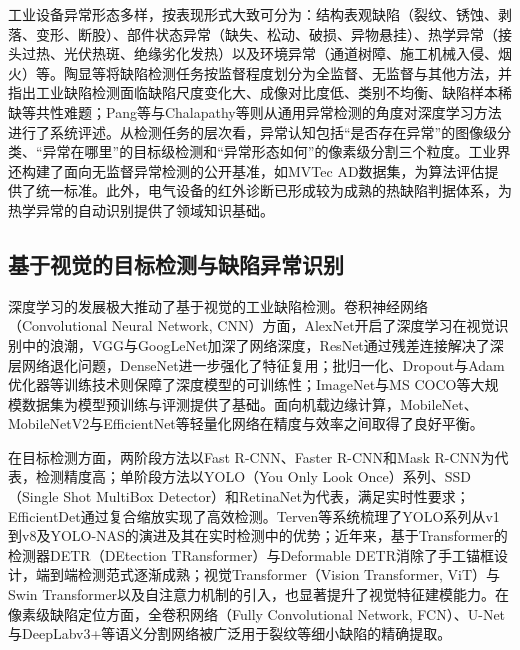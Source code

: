 工业设备异常形态多样，按表现形式大致可分为：结构表观缺陷（裂纹、锈蚀、剥落、变形、断股）、部件状态异常（缺失、松动、破损、异物悬挂）、热学异常（接头过热、光伏热斑、绝缘劣化发热）以及环境异常（通道树障、施工机械入侵、烟火）等\cite{taox2021survey,nguyen2018automatic,miao2020uav}。陶显等\cite{taox2021survey}将缺陷检测任务按监督程度划分为全监督、无监督与其他方法，并指出工业缺陷检测面临缺陷尺度变化大、成像对比度低、类别不均衡、缺陷样本稀缺等共性难题；Pang等\cite{pang2021deep}与Chalapathy等则从通用异常检测的角度对深度学习方法进行了系统评述。从检测任务的层次看，异常认知包括“是否存在异常”的图像级分类、“异常在哪里”的目标级检测和“异常形态如何”的像素级分割三个粒度\cite{taox2021survey}。工业界还构建了面向无监督异常检测的公开基准，如MVTec AD数据集\cite{bergmann2019mvtec}，为算法评估提供了统一标准。此外，电气设备的红外诊断已形成较为成熟的热缺陷判据体系\cite{jadin2012recent,usamentiaga2014infrared}，为热学异常的自动识别提供了领域知识基础。

\subsection{基于视觉的目标检测与缺陷异常识别}

深度学习的发展极大推动了基于视觉的工业缺陷检测。卷积神经网络（Convolutional Neural Network, CNN）方面，AlexNet\cite{krizhevsky2012imagenet}开启了深度学习在视觉识别中的浪潮，VGG\cite{simonyan2015very}与GoogLeNet加深了网络深度，ResNet\cite{he2016deep}通过残差连接解决了深层网络退化问题，DenseNet进一步强化了特征复用；批归一化\cite{ioffe2015batch}、Dropout\cite{srivastava2014dropout}与Adam优化器\cite{kingma2015adam}等训练技术则保障了深度模型的可训练性；ImageNet\cite{deng2009imagenet}与MS COCO\cite{lin2014microsoft}等大规模数据集为模型预训练与评测提供了基础。面向机载边缘计算，MobileNet\cite{howard2017mobilenets}、MobileNetV2与EfficientNet\cite{tan2019efficientnet}等轻量化网络在精度与效率之间取得了良好平衡。

在目标检测方面，两阶段方法以Fast R-CNN\cite{girshick2015fast}、Faster R-CNN\cite{ren2015faster}和Mask R-CNN\cite{he2017mask}为代表，检测精度高；单阶段方法以YOLO（You Only Look Once）系列\cite{redmon2016you,redmon2017yolo9000,redmon2018yolov3,bochkovskiy2020yolov4,wang2023yolov7}、SSD（Single Shot MultiBox Detector）\cite{liu2016ssd}和RetinaNet\cite{lin2017focal}为代表，满足实时性要求；EfficientDet\cite{tan2020efficientdet}通过复合缩放实现了高效检测。Terven等\cite{terven2025yolo}系统梳理了YOLO系列从v1到v8及YOLO-NAS的演进及其在实时检测中的优势；近年来，基于Transformer的检测器DETR（DEtection TRansformer）\cite{carion2020end}与Deformable DETR\cite{zhu2021deformable}消除了手工锚框设计，端到端检测范式逐渐成熟；视觉Transformer（Vision Transformer, ViT）\cite{dosovitskiy2021image}与Swin Transformer\cite{liu2021swin}以及自注意力机制\cite{vaswani2017attention}的引入，也显著提升了视觉特征建模能力。在像素级缺陷定位方面，全卷积网络（Fully Convolutional Network, FCN）\cite{long2015fully}、U-Net\cite{ronneberger2015u}与DeepLabv3+等语义分割网络被广泛用于裂纹等细小缺陷的精确提取。



